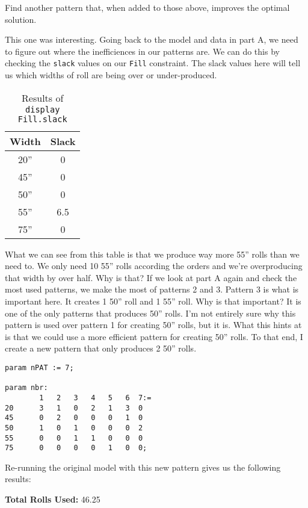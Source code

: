 \prob 

Find another pattern that, when added to those above, improves the optimal solution.

\sol

This one was interesting. Going back to the model and data in part A, we need to figure out where the inefficiences in our patterns are. We can do this by checking the \texttt{slack} values on our \texttt{Fill} constraint. The slack values here will tell us which widths of roll are being over or under-produced. 

\begin{table}[!ht]
	\centering
	\begin{tabular}{|c|c|}
		\hline
		Width & Slack \\
		\hline 
		20'' & 0 \\
		45'' & 0 \\
		50'' & 0 \\
		55'' & 6.5 \\
		75'' & 0 \\
		\hline
	\end{tabular}
	\caption{Results of \texttt{display Fill.slack}}
	\label{tab:<+label+>}
\end{table}

What we can see from this table is that we produce way more 55'' rolls than we need to. We only need 10 55'' rolls according the orders and we're overproducing that width by over half. Why is that? If we look at part A again and check the most used patterns, we make the most of patterns 2 and 3. Pattern 3 is what is important here. It creates 1 50'' roll and 1 55'' roll. Why is that important? It is one of the only patterns that produces 50'' rolls. I'm not entirely sure why this pattern is used over pattern 1 for creating 50'' rolls, but it is. What this hints at is that we could use a more efficient pattern for creating 50'' rolls. To that end, I create a new pattern that only produces 2 50'' rolls. 

\begin{lstlisting}
param nPAT := 7;

param nbr:
        1   2   3   4   5   6  7:=
20      3   1   0   2   1   3  0
45      0   2   0   0   0   1  0
50      1   0   1   0   0   0  2
55      0   0   1   1   0   0  0
75      0   0   0   0   1   0  0;
\end{lstlisting}

Re-running the original model with this new pattern gives us the following results:

\noindent\textbf{Total Rolls Used:} 46.25

